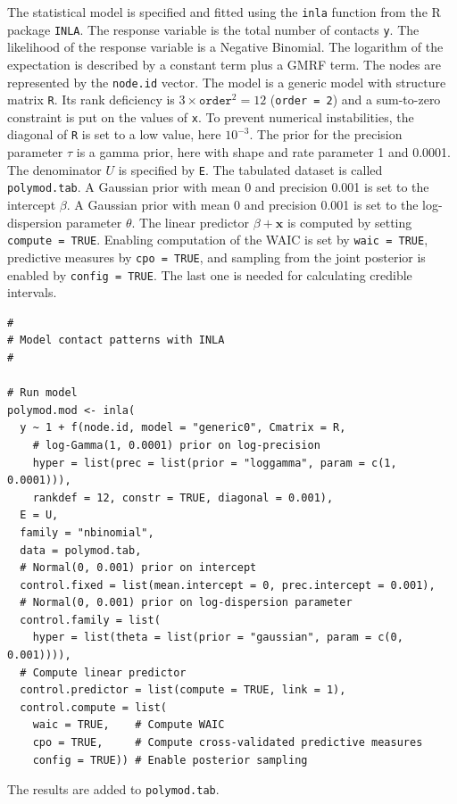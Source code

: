 \documentclass[aoas,preprint]{imsart}
\numberwithin{equation}{section}
\begin{document}
The statistical model is specified and fitted using the \texttt{inla} function from the R package \texttt{INLA}. The response variable is the total number of contacts \texttt{y}. The likelihood of the response variable is a Negative Binomial. The logarithm of the expectation is described by a constant term plus a GMRF term. The nodes are represented by the \texttt{node.id} vector. The model is a generic model with structure matrix \texttt{R}. Its rank deficiency is $3 \times \texttt{order}^2 = 12$ (\texttt{order = 2}) and a sum-to-zero constraint is put on the values of \texttt{x}. To prevent numerical instabilities, the diagonal of \texttt{R} is set to a low value, here $10^{-3}$. The prior for the precision parameter $\tau$ is a gamma prior, here with shape and rate parameter 1 and 0.0001. The denominator $U$ is specified by \texttt{E}. The tabulated dataset is called \texttt{polymod.tab}. A Gaussian prior with mean 0 and precision 0.001 is set to the intercept $\beta$. A Gaussian prior with mean 0 and precision 0.001 is set to the log-dispersion parameter $\theta$. The linear predictor $\beta+\bm{x}$ is computed by setting \texttt{compute = TRUE}. Enabling computation of the WAIC is set by \texttt{waic = TRUE}, predictive measures by \texttt{cpo = TRUE}, and sampling from the joint posterior is enabled by \texttt{config = TRUE}. The last one is needed for calculating credible intervals.

\begin{verbatim}
#
# Model contact patterns with INLA
#

# Run model
polymod.mod <- inla(
  y ~ 1 + f(node.id, model = "generic0", Cmatrix = R,
    # log-Gamma(1, 0.0001) prior on log-precision
    hyper = list(prec = list(prior = "loggamma", param = c(1, 0.0001))),
    rankdef = 12, constr = TRUE, diagonal = 0.001),
  E = U,
  family = "nbinomial",
  data = polymod.tab,
  # Normal(0, 0.001) prior on intercept
  control.fixed = list(mean.intercept = 0, prec.intercept = 0.001),
  # Normal(0, 0.001) prior on log-dispersion parameter
  control.family = list(
    hyper = list(theta = list(prior = "gaussian", param = c(0, 0.001)))),
  # Compute linear predictor
  control.predictor = list(compute = TRUE, link = 1),
  control.compute = list(
    waic = TRUE,    # Compute WAIC
    cpo = TRUE,     # Compute cross-validated predictive measures
    config = TRUE)) # Enable posterior sampling
\end{verbatim}

The results are added to \texttt{polymod.tab}.
\end{document}
